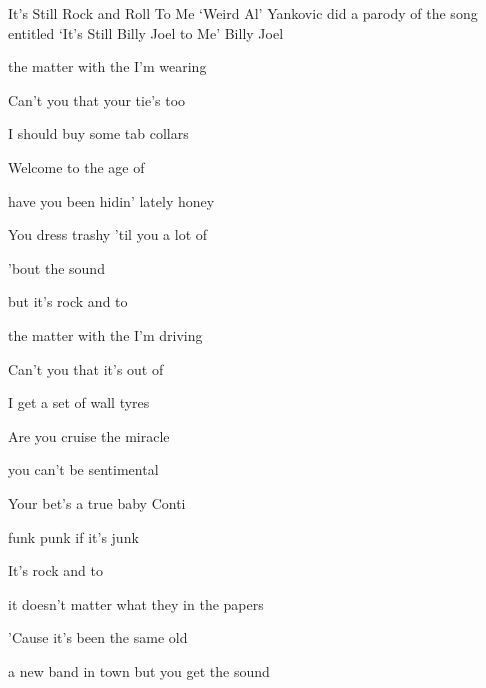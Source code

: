 \begin{SBSong}{It's Still Rock and Roll To Me}
    {`Weird Al' Yankovic did a parody of the song entitled `It's Still Billy Joel to Me'}
    {Billy Joel}
  \begin{SBVerse}
	 the matter with the  I'm wearing 
	
	Can't you  that your tie's too 
	
	 I should buy some  tab collars 
	
	Welcome  to the age of  
	
	 have you been hidin'  lately honey 
	
	You  dress trashy 'til you  a lot of  
	
	  'bout the  sound 
	
	 but it's  rock and  to 
  \end{SBVerse}
  \begin{SBVerse}
	 the matter with the  I'm driving
	
	Can't you  that it's out of 
	
	 I get a set of  wall tyres 
	
	Are you  cruise the miracle  
	
	 you can't be  sentimental 
	
	Your  bet's a true baby  Conti 
	
	 funk  punk  if it's  junk 
	
	It's  rock and  to 
  \end{SBVerse}
  \CBPageBrk
  \begin{SBVerse}
	 it doesn't matter what they  in the papers 
	
	'Cause it's  been the same old 
	
	 a new band in town but you  get the sound 
	

\end{SBVerse}
\end{SBSong}
